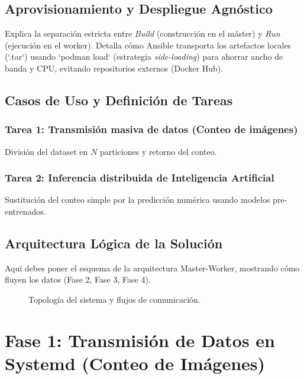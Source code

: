 \documentclass[11pt, a4paper]{report}
\begin{document}
\section{Aprovisionamiento y Despliegue Agnóstico}
Explica la separación estricta entre \textit{Build} (construcción en el máster) y \textit{Run} (ejecución en el worker). Detalla cómo Ansible transporta los artefactos locales (`.tar`) usando `podman load` (estrategia \textit{side-loading}) para ahorrar ancho de banda y CPU, evitando repositorios externos (Docker Hub).

\section{Casos de Uso y Definición de Tareas}
\subsection{Tarea 1: Transmisión masiva de datos (Conteo de imágenes)}
División del dataset en $N$ particiones y retorno del conteo.
\subsection{Tarea 2: Inferencia distribuida de Inteligencia Artificial}
Sustitución del conteo simple por la predicción numérica usando modelos pre-entrenados.

\section{Arquitectura Lógica de la Solución}
Aquí debes poner el esquema de la arquitectura Master-Worker, mostrando cómo fluyen los datos (Fase 2, Fase 3, Fase 4).

\begin{figure}[htbp]
  \centering
  \caption{Topología del sistema y flujos de comunicación.}
  \label{fig:arquitectura}
\end{figure}

\chapter{Fase 1: Transmisión de Datos en Systemd (Conteo de Imágenes)}
\end{document}
